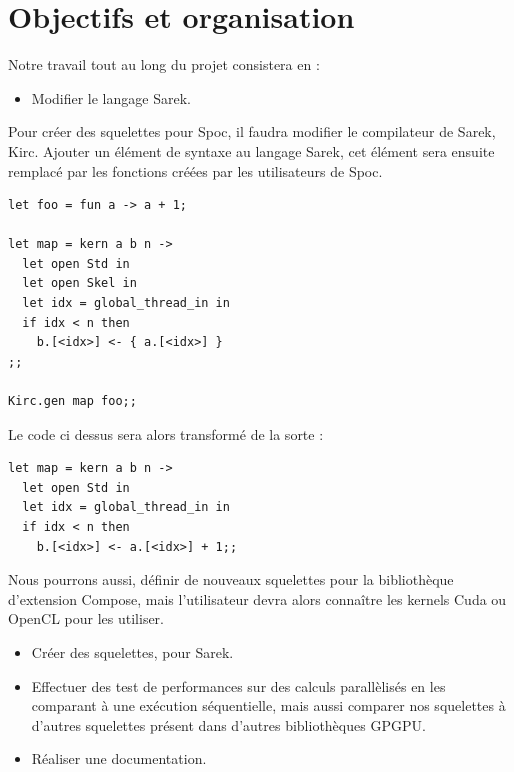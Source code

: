 \documentclass{report}
\begin{document}
\chapter{Objectifs et organisation}

Notre travail tout au long du projet consistera en :
\begin{itemize}
\item Modifier le langage Sarek.
\end{itemize}

Pour créer des squelettes pour Spoc, il faudra modifier le compilateur de Sarek, Kirc. Ajouter un élément de syntaxe au langage Sarek, cet élément sera ensuite remplacé par les fonctions créées par les utilisateurs de Spoc. 

\begin{lstlisting}
let foo = fun a -> a + 1;

let map = kern a b n ->
  let open Std in
  let open Skel in
  let idx = global_thread_in in
  if idx < n then
    b.[<idx>] <- { a.[<idx>] }
;;

Kirc.gen map foo;; 
\end{lstlisting}

Le code ci dessus sera alors transformé de la sorte :

\begin{lstlisting}
let map = kern a b n ->
  let open Std in
  let idx = global_thread_in in
  if idx < n then
    b.[<idx>] <- a.[<idx>] + 1;;
\end{lstlisting}

Nous pourrons aussi, définir de nouveaux squelettes pour la bibliothèque d’extension Compose, mais l’utilisateur devra alors connaître les kernels Cuda ou OpenCL pour les utiliser. 

\begin{itemize}
\item Créer des squelettes, pour Sarek.
\item Effectuer des test de performances sur des calculs parallèlisés en les comparant à une exécution séquentielle, mais aussi comparer nos squelettes à d’autres squelettes présent dans d’autres bibliothèques GPGPU.
\item Réaliser une documentation.
\end{itemize}



\end{document}
